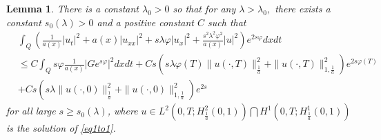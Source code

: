 \documentclass[reqno]{amsart}
\theoremstyle{plain}
\newtheorem{lemma}[theorem]{Lemma}
\theoremstyle{remark}
\numberwithin{equation}{section}
\begin{document}
\begin{lemma}\label{lem1}
There is a constant $\lambda_{0}>0$ so that for any $\lambda>\lambda_{0},$ there exists a constant $s_{0}(\lambda)>0$ and a positive constant $C$ such that
\begin{equation}\label{Carlm HJB}
    \begin{aligned}
           &\int_{Q} \left(\frac{1}{a(x)}\vert u_{t}\vert^2+ a(x)\vert u_{xx}\vert^2+ s\lambda \varphi \vert u_{x}\vert^2+ \frac{s^2\lambda^2\varphi^2}{a(x)}\vert u\vert^2\right)e^{2s\varphi}dxdt\\&\leqslant C  \int_{Q}s\varphi\frac{1}{a(x)}\vert Ge^{s\varphi}\vert^2 dxdt +Cs\left( s\lambda\varphi(T)\| u(\cdot,T)\|_{\frac{1}{a}}^2+\| u(\cdot,T)\|_{1,\frac{1}{a}}^2 \right)e^{2s\varphi(T)}\\& +Cs\left( s\lambda\| u(\cdot,0)\|_{\frac{1}{a}}^2+\| u(\cdot,0)\|_{1,\frac{1}{a}}^2\right)e^{2s}
    \end{aligned}
\end{equation}
for all large $s\ge s_{0}(\lambda)$, where $u \in L^2\left(0,T;H^2_{\frac{1}{a}}(0,1)\right)\bigcap H^1\left(0,T; H^1_{\frac{1}{a}}(0,1)\right)$ is the solution of \eqref{eq1to1}.
\end{lemma}
\end{document}
